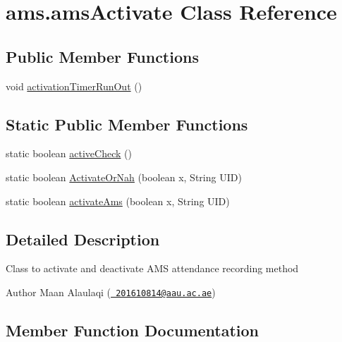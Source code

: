 \hypertarget{classams_1_1ams_activate}{}\section{ams.\+ams\+Activate Class Reference}
\label{classams_1_1ams_activate}
\subsection*{Public Member Functions}
\begin{DoxyCompactItemize}
\item 
void \mbox{\hyperlink{classams_1_1ams_activate_a5ed697f974ce79263f7974f29a11312b}{activation\+Timer\+Run\+Out}} ()
\end{DoxyCompactItemize}
\subsection*{Static Public Member Functions}
\begin{DoxyCompactItemize}
\item 
static boolean \mbox{\hyperlink{classams_1_1ams_activate_a0d114e5980e360dddeb2c9243cdc3b52}{active\+Check}} ()
\item 
static boolean \mbox{\hyperlink{classams_1_1ams_activate_a01ac1b9a3cd5d20b61b46496a7ff3a95}{Activate\+Or\+Nah}} (boolean x, String U\+ID)
\item 
static boolean \mbox{\hyperlink{classams_1_1ams_activate_a103584e81b703fa2552d353d14366057}{activate\+Ams}} (boolean x, String U\+ID)
\end{DoxyCompactItemize}


\subsection{Detailed Description}
Class to activate and deactivate A\+MS attendance recording method

\begin{DoxyAuthor}{Author}
Maan Alaulaqi (\href{mailto:201610814@aau.ac.ae}{\texttt{ 201610814@aau.\+ac.\+ae}}) 
\end{DoxyAuthor}


\subsection{Member Function Documentation}
\mbox{\label{classams_1_1ams_activate_a103584e81b703fa2552d353d14366057}} 

